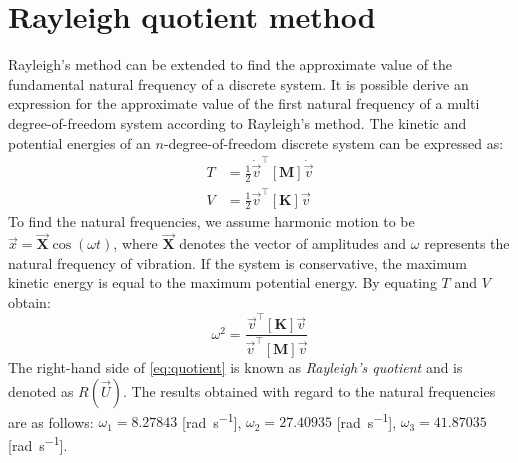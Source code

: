 \section{Rayleigh quotient method}
\label{sec:ray}
Rayleigh's method can be extended to find the approximate value of the fundamental
natural frequency of a discrete system.
It is possible derive an expression for the approximate value of the first
natural frequency of a multi degree-of-freedom system according to Rayleigh's
method.
The kinetic and potential energies of an \(n\)-degree-of-freedom discrete system
can be expressed as:
\begin{align}\label{eq:energyequation}
  T &= \frac{1}{2}\dot{\vec{v}}^{\top}[\mathbf{M}]\dot{\vec{v}}\\[1em]
  V &= \frac{1}{2}\vec{v}^{\top}[\mathbf{K}]\vec{v}
\end{align}
To find the natural frequencies, we assume harmonic motion to be
\(\vec{x} = \vec{\mathbf{X}} \cos(\omega t)\), where \(\vec{\mathbf{X}}\) 
denotes the vector of amplitudes and \(\omega\) represents the natural frequency
of vibration.
If the system is conservative, the maximum kinetic energy is equal to the
maximum potential energy. By equating \(T\) and \(V\) obtain:
\begin{equation}\label{eq:quotient}
  \omega^2 = \frac{\vec{v}^{\top}[\mathbf{K}]\vec{v}}
  {\vec{v}^{\top}[\mathbf{M}]\vec{v}}
\end{equation}
%
The right-hand side of \eqref{eq:quotient} is known as \emph{Rayleigh's quotient}
and is denoted as \(R(\vec{U})\).
The results obtained with regard to the natural frequencies are as follows:
\(\omega_{1} = 8.27843\) [\si{\radian\per\second}],
\(\omega_{2} = 27.40935\) [\si{\radian\per\second}],
\(\omega_{3} = 41.87035\) [\si{\radian\per\second}].
